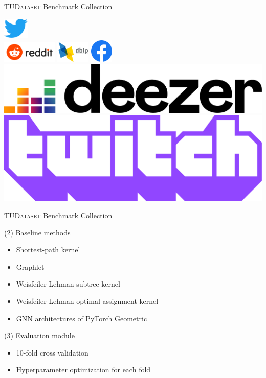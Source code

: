 \documentclass[utf8, xcolor=dvipsnames,ngerman]{beamer}
\begin{document}
\begin{frame}[t]{\textsc{TUDataset} Benchmark Collection}
\begin{center}
{\includegraphics[height=1cm]{Twitter_bird_logo_2012.pdf}\\ \vspace{.7em}
\includegraphics[height=1cm]{Reddit_logo_new.pdf}\qquad
\includegraphics[height=1cm]{DBLP_Logo_320x120.png}\qquad
\includegraphics[height=1.1cm]{Facebook_f_logo.pdf}\\ \vspace{.7em}
\includegraphics[height=.9cm]{Deezer_logo.pdf}\qquad
\includegraphics[height=.9cm]{Twitch_logo_2019.pdf}
}%

\end{center}


\end{frame}


\begin{frame}{\textsc{TUDataset} Benchmark Collection}

\begin{block}{(2) Baseline methods}
 \begin{itemize}
  \item Shortest-path kernel 
  \item Graphlet  
  \item Weisfeiler-Lehman subtree kernel 
  \item Weisfeiler-Lehman optimal assignment kernel 
  \item GNN architectures of PyTorch Geometric 
 \end{itemize}
\end{block}

\pause

\begin{block}{(3) Evaluation module}
 \begin{itemize}
  \item 10-fold cross validation
  \item Hyperparameter optimization for each fold
 \end{itemize}
\end{block}
 
\end{frame}
\end{document}
